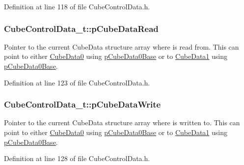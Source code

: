 Definition at line 118 of file Cube\+Control\+Data.\+h.

\hypertarget{struct_cube_control_data__t_a981fbbdd6a05af493c7ae6782bdcb9af}{}
\subsubsection[{p\+Cube\+Data\+Read}]{ Cube\+Control\+Data\+\_\+t\+::p\+Cube\+Data\+Read}\label{struct_cube_control_data__t_a981fbbdd6a05af493c7ae6782bdcb9af}
Pointer to the current Cube\+Data structure array where is read from. This can point to either \hyperlink{struct_cube_control_data__t_a4fcbd72fab1f862e17acc3f96efe8d4c}{Cube\+Data0} using \hyperlink{_cube_control_data_8c_ae726beefa78aea201161f0cf5744dcee}{p\+Cube\+Data0\+Base} or to \hyperlink{struct_cube_control_data__t_a647ae59f9e5f0842d92ef0241db2a141}{Cube\+Data1} using \hyperlink{_cube_control_data_8c_ae726beefa78aea201161f0cf5744dcee}{p\+Cube\+Data0\+Base}. 

Definition at line 123 of file Cube\+Control\+Data.\+h.

\hypertarget{struct_cube_control_data__t_aa60f6c5f56c138fba459e0a990248e0f}{}
\subsubsection[{p\+Cube\+Data\+Write}]{ Cube\+Control\+Data\+\_\+t\+::p\+Cube\+Data\+Write}\label{struct_cube_control_data__t_aa60f6c5f56c138fba459e0a990248e0f}
Pointer to the current Cube\+Data structure array where is written to. This can point to either \hyperlink{struct_cube_control_data__t_a4fcbd72fab1f862e17acc3f96efe8d4c}{Cube\+Data0} using \hyperlink{_cube_control_data_8c_ae726beefa78aea201161f0cf5744dcee}{p\+Cube\+Data0\+Base} or to \hyperlink{struct_cube_control_data__t_a647ae59f9e5f0842d92ef0241db2a141}{Cube\+Data1} using \hyperlink{_cube_control_data_8c_ae726beefa78aea201161f0cf5744dcee}{p\+Cube\+Data0\+Base}. 

Definition at line 128 of file Cube\+Control\+Data.\+h.

